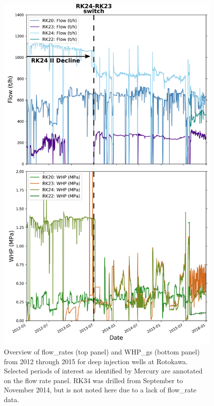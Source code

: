 \begin{figure}[p]
\begin{center}
\includegraphics[width=0.82\columnwidth]{Chapter_1_Intro/figures/Rotokawa_overview_Intro/Rotokawa_overview_Intro_3-20}
\caption[Rotokawa flow rates and wellhead pressures: 2012--2015]{{
Overview of \glspl{flow_rate} (top panel) and \glspl{WHP_g} (bottom panel)
from 2012 through 2015 for deep injection wells at Rotokawa. Selected
periods of interest as identified by Mercury are annotated on the flow
rate panel. RK34 was drilled from September to November 2014, but is not noted here due to a lack of \gls{flow_rate} data.
{\label{701773}}%
}}
\end{center}
\end{figure}


